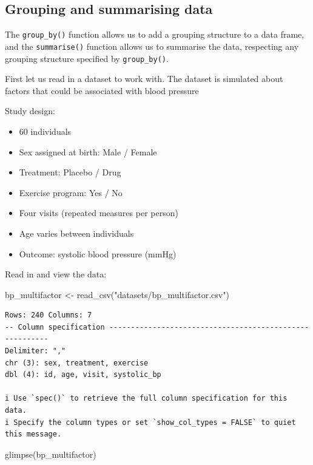 \documentclass[
  letterpaper,
  8pt,
  a4paper]{book}
\newenvironment{Shaded}{\begin{snugshade}}{\end{snugshade}}
\newcommand{\FunctionTok}[1]{\textcolor[rgb]{0.28,0.35,0.67}{#1}}
\newcommand{\NormalTok}[1]{\textcolor[rgb]{0.00,0.23,0.31}{#1}}
\newcommand{\OtherTok}[1]{\textcolor[rgb]{0.00,0.23,0.31}{#1}}
\newcommand{\StringTok}[1]{\textcolor[rgb]{0.13,0.47,0.30}{#1}}
\providecommand{\tightlist}{%
  \setlength{\itemsep}{0pt}\setlength{\parskip}{0pt}}
\begin{document}
\subsection*{Grouping and summarising
data}\label{grouping-and-summarising-data}

The \texttt{group\_by()} function allows us to add a grouping structure
to a data frame, and the \texttt{summarise()} function allows us to
summarise the data, respecting any grouping structure specified by
\texttt{group\_by()}.

First let us read in a dataset to work with. The dataset is simulated
about factors that could be associated with blood pressure

Study design:

\begin{itemize}
\tightlist
\item
  60 individuals
\item
  Sex assigned at birth: Male / Female
\item
  Treatment: Placebo / Drug
\item
  Exercise program: Yes / No
\item
  Four visits (repeated measures per person)
\item
  Age varies between individuals
\item
  Outcome: systolic blood pressure (mmHg)
\end{itemize}

Read in and view the data:

\begin{Shaded}
\begin{Highlighting}[]
\NormalTok{bp\_multifactor }\OtherTok{\textless{}{-}} \FunctionTok{read\_csv}\NormalTok{(}\StringTok{"datasets/bp\_multifactor.csv"}\NormalTok{)}
\end{Highlighting}
\end{Shaded}

\begin{verbatim}
Rows: 240 Columns: 7
-- Column specification --------------------------------------------------------
Delimiter: ","
chr (3): sex, treatment, exercise
dbl (4): id, age, visit, systolic_bp

i Use `spec()` to retrieve the full column specification for this data.
i Specify the column types or set `show_col_types = FALSE` to quiet this message.
\end{verbatim}

\begin{Shaded}
\begin{Highlighting}[]
\FunctionTok{glimpse}\NormalTok{(bp\_multifactor)}
\end{Highlighting}
\end{Shaded}
\end{document}
